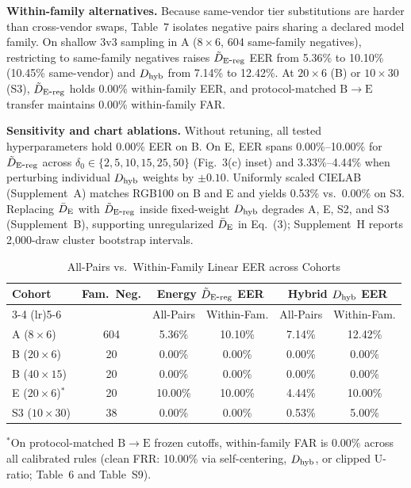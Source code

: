 \textbf{Within-family alternatives.} Because same-vendor tier substitutions are harder than cross-vendor swaps, Table~7 isolates negative pairs sharing a declared model family. On shallow 3v3 sampling in A ($8\times 6$, 604 same-family negatives), restricting to same-family negatives raises $\tilde D_{\mathrm{E\mbox{-}reg}}{}$ EER from 5.36\% to 10.10\% (10.45\% same-vendor) and $D_{\mathrm{hyb}}{}$ from 7.14\% to 12.42\%. At $20\times 6$ (B) or $10\times 30$ (S3), $\tilde D_{\mathrm{E\mbox{-}reg}}{}$ holds 0.00\% within-family EER, and protocol-matched $\mathrm{B}\rightarrow\mathrm{E}$ transfer maintains 0.00\% within-family FAR.

\textbf{Sensitivity and chart ablations.} Without retuning, all tested hyperparameters hold 0.00\% EER on B. On E, EER spans 0.00\%--10.00\% for $\tilde D_{\mathrm{E\mbox{-}reg}}{}$ across $\delta_0 \in \{2, 5, 10, 15, 25, 50\}$ (Fig.~3(c) inset) and 3.33\%--4.44\% when perturbing individual $D_{\mathrm{hyb}}{}$ weights by $\pm 0.10$. Uniformly scaled CIELAB (Supplement~A) matches RGB100 on B and E and yields 0.53\% vs.\ 0.00\% on S3. Replacing $\bar D_{\mathrm E}{}$ with $\tilde D_{\mathrm{E\mbox{-}reg}}{}$ inside fixed-weight $D_{\mathrm{hyb}}{}$ degrades A, E, S2, and S3 (Supplement~B), supporting unregularized $\bar D_{\mathrm E}{}$ in Eq.~(3); Supplement~H reports 2,000-draw cluster bootstrap intervals.

\begin{table}[t]
\centering
\caption{All-Pairs vs.\ Within-Family Linear EER across Cohorts}
\label{tab:within_family}
\footnotesize\setlength{\tabcolsep}{1.5pt}\renewcommand{\arraystretch}{1.05}
\begin{tabular*}{\columnwidth}{@{\extracolsep{\fill}}lccccc@{}}
\toprule
Cohort & Fam.\ Neg. & \multicolumn{2}{c}{Energy $\tilde D_{\mathrm{E\mbox{-}reg}}{}$ EER} & \multicolumn{2}{c}{Hybrid $D_{\mathrm{hyb}}{}$ EER} \\
\cmidrule(lr){3-4} \cmidrule(lr){5-6}
 & & All-Pairs & Within-Fam. & All-Pairs & Within-Fam. \\
\midrule
A ($8\times 6$) & 604 & 5.36\% & 10.10\% & 7.14\% & 12.42\% \\
B ($20\times 6$) & 20 & 0.00\% & 0.00\% & 0.00\% & 0.00\% \\
B ($40\times 15$) & 20 & 0.00\% & 0.00\% & 0.00\% & 0.00\% \\
E ($20\times 6$)$^*$ & 20 & 10.00\% & 10.00\% & 4.44\% & 10.00\% \\
S3 ($10\times 30$) & 38 & 0.00\% & 0.00\% & 0.53\% & 5.00\% \\
\bottomrule
\end{tabular*}
\par\smallskip\footnotesize{$^*$On protocol-matched $\mathrm{B}\rightarrow\mathrm{E}$ frozen cutoffs, within-family FAR is 0.00\% across all calibrated rules (clean FRR: 10.00\% via self-centering, $D_{\mathrm{hyb}}{}$, or clipped U-ratio; Table~6 and Table~S9).}
\end{table}

